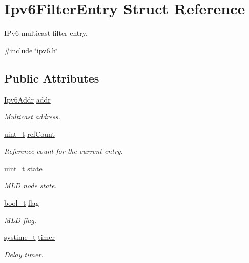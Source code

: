 \hypertarget{structIpv6FilterEntry}{}\section{Ipv6\+Filter\+Entry Struct Reference}
\label{structIpv6FilterEntry}


I\+Pv6 multicast filter entry.  




{\ttfamily \#include \char`\"{}ipv6.\+h\char`\"{}}

\subsection*{Public Attributes}
\begin{DoxyCompactItemize}
\item 
\hyperlink{ipv6_8h_aed0cbc40c61ed5b4fb681ebc55237e89}{Ipv6\+Addr} \hyperlink{structIpv6FilterEntry_ab3f4b20455a0f3d0912b2dfad354ef86}{addr}
\begin{DoxyCompactList}\small\item\em Multicast address. \end{DoxyCompactList}\item 
\hyperlink{compiler__port_8h_a12a1e9b3ce141648783a82445d02b58d}{uint\+\_\+t} \hyperlink{structIpv6FilterEntry_a1d01842023f238350bc3f6dfa99999c6}{ref\+Count}
\begin{DoxyCompactList}\small\item\em Reference count for the current entry. \end{DoxyCompactList}\item 
\hyperlink{compiler__port_8h_a12a1e9b3ce141648783a82445d02b58d}{uint\+\_\+t} \hyperlink{structIpv6FilterEntry_a1b5076e55c13c43bdf6eb2b501a483df}{state}
\begin{DoxyCompactList}\small\item\em M\+LD node state. \end{DoxyCompactList}\item 
\hyperlink{compiler__port_8h_a812d16e5494522586b3784e55d479912}{bool\+\_\+t} \hyperlink{structIpv6FilterEntry_a4ad89b0f2c7f11c673ffcf11768f5eb7}{flag}
\begin{DoxyCompactList}\small\item\em M\+LD flag. \end{DoxyCompactList}\item 
\hyperlink{compiler__port_8h_ae3e32a98d431a02106616da3071832dd}{systime\+\_\+t} \hyperlink{structIpv6FilterEntry_a31cc506fa97ca4281048443be7eb8d6a}{timer}
\begin{DoxyCompactList}\small\item\em Delay timer. \end{DoxyCompactList}\end{DoxyCompactItemize}


